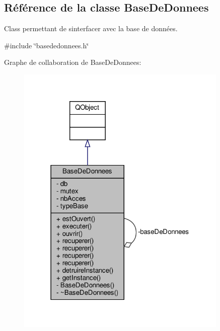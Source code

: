 \hypertarget{class_base_de_donnees}{}\subsection{Référence de la classe Base\+De\+Donnees}
\label{class_base_de_donnees}


Class permettant de s\textquotesingle{}interfacer avec la base de données.  




{\ttfamily \#include \char`\"{}basededonnees.\+h\char`\"{}}



Graphe de collaboration de Base\+De\+Donnees\+:
\nopagebreak
\begin{figure}[H]
\begin{center}
\leavevmode
\includegraphics[width=286pt]{class_base_de_donnees__coll__graph}
\end{center}
\end{figure}
